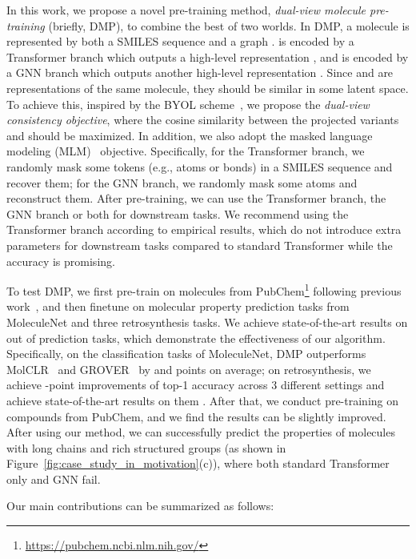 \documentclass{article}
\newcommand{\ourM}{DMP}
\begin{document}
In this work, we propose a novel pre-training method, {\it dual-view molecule pre-training} (briefly, \ourM{}), to combine the best of two worlds. In \ourM{}, a molecule  is represented by both a SMILES sequence  and a graph .  is encoded by a Transformer branch which outputs a high-level representation , and  is encoded by a GNN branch which outputs another high-level representation . Since  and  are representations of the same molecule, they should be similar in some latent space. To achieve this, inspired by the BYOL scheme~\cite{BYOL2020}, we propose the {\it dual-view consistency objective}, where the cosine similarity between the projected variants  and  should be maximized. In addition, we also adopt the masked language modeling (MLM)~\cite{hu2019strategies,chithrananda2020chemberta,devlin2018bert} objective. Specifically, for the Transformer branch, we randomly mask some tokens (e.g., atoms or bonds) in a SMILES sequence and recover them; for the GNN branch, we randomly mask some atoms and reconstruct them. After pre-training, we can use the Transformer branch, the GNN branch or both for downstream tasks. We recommend using the Transformer branch according to empirical results, which do not introduce extra parameters for downstream tasks compared to standard Transformer while the accuracy is promising. 

To test \ourM{}, we first pre-train on  molecules from PubChem\footnote{\url{https://pubchem.ncbi.nlm.nih.gov/}} following previous work~\cite{chithrananda2020chemberta,wang2021molclr}, and then finetune on  molecular property prediction tasks from MoleculeNet \citep{wu2018moleculenet} and three retrosynthesis tasks. We achieve state-of-the-art results on  out of  prediction tasks, which demonstrate the effectiveness of our algorithm. Specifically, on the classification tasks of MoleculeNet, \ourM{} outperforms MolCLR~\cite{wang2021molclr} and GROVER~\cite{rong2020self} by  and  points on average; on retrosynthesis, we  achieve -point improvements of top-1 accuracy across 3 different settings and achieve state-of-the-art results on them \citep{GLN,NEURIPS2020_819f46e5,tetko2020state}. After that, we conduct pre-training on  compounds from PubChem, and we find the results can be slightly improved. After using our method, we can successfully predict the properties 
of molecules with long chains and rich structured groups (as shown in Figure~\ref{fig:case_study_in_motivation}(c)), where both standard Transformer only and GNN fail.

Our main contributions can be summarized as follows:
\end{document}
